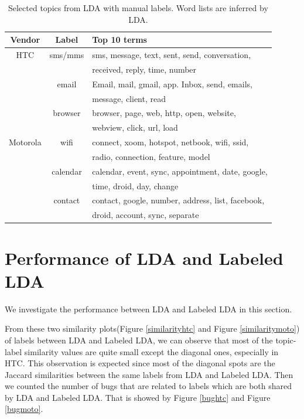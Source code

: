 \documentclass[10pt, conference, compsocconf]{IEEEtran}
\begin{document}
\begin{table}[!t]
\renewcommand{\arraystretch}{1.3}
\caption{Selected topics from LDA with manual labels. Word lists are inferred by LDA.}
\label{seleted2}
\centering
\begin{tabular}{|c||c||l|}
\hline
Vendor & Label & Top 10 terms\\
\hline
HTC & sms\//mms &sms, message, text, sent, send, conversation, \\
            && received, reply, time, number \\ \cline{2-3}
  & email & Email, mail, gmail, app. Inbox, send, emails, \\
            &&message, client, read \\ \cline{2-3}
  & browser&browser, page, web, http, open, website, \\
            &&webview, click, url, load\\
\hline
Motorola & wifi &connect, xoom, hotspot, netbook, wifi, ssid, \\
           &&radio, connection, feature, model\\ \cline{2-3}
    &calendar& calendar, event, sync, appointment, date, google, \\
           &&time, droid, day, change \\ \cline{2-3}
    &contact & contact, google, number, address, list, facebook, \\
           &&droid, account, sync, separate \\
\hline
\end{tabular}
\end{table}


\section{Performance of LDA and Labeled LDA}
We investigate the performance between LDA and Labeled LDA in this section.

From these two similarity plots(Figure \ref{similarityhtc} and Figure \ref{similaritymoto}) of labels between LDA and Labeled LDA, we can observe that most of the topic-label similarity values are quite small except the diagonal ones, especially in HTC. This observation is expected since most of the diagonal spots are the Jaccard similarities between the same labels from LDA and Labeled LDA. Then we counted the number of bugs that are related to labels which are both shared by LDA and Labeled LDA. That is showed by Figure \ref{bughtc} and Figure \ref{bugmoto}.
\end{document}
